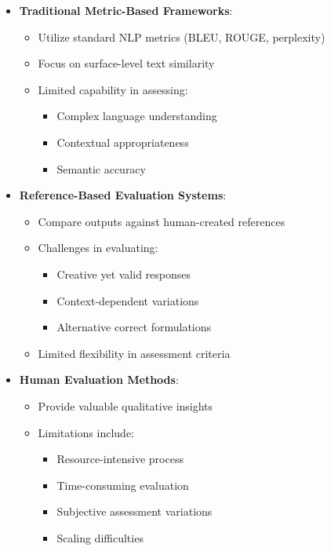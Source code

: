 \begin{itemize}
    \item \textbf{Traditional Metric-Based Frameworks}:
    \begin{itemize}
        \item Utilize standard NLP metrics (BLEU, ROUGE, perplexity)
        \item Focus on surface-level text similarity
        \item Limited capability in assessing:
        \begin{itemize}
            \item Complex language understanding
            \item Contextual appropriateness
            \item Semantic accuracy
        \end{itemize}
    \end{itemize}
    
    \item \textbf{Reference-Based Evaluation Systems}:
    \begin{itemize}
        \item Compare outputs against human-created references
        \item Challenges in evaluating:
        \begin{itemize}
            \item Creative yet valid responses
            \item Context-dependent variations
            \item Alternative correct formulations
        \end{itemize}
        \item Limited flexibility in assessment criteria
    \end{itemize}
    
    \item \textbf{Human Evaluation Methods}:
    \begin{itemize}
        \item Provide valuable qualitative insights
        \item Limitations include:
        \begin{itemize}
            \item Resource-intensive process
            \item Time-consuming evaluation
            \item Subjective assessment variations
            \item Scaling difficulties
        \end{itemize}
    \end{itemize}
\end{itemize}

